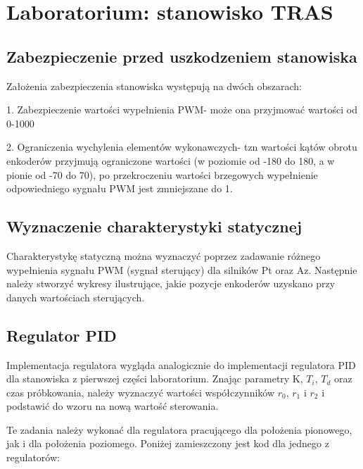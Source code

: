 \chapter{Laboratorium: stanowisko TRAS}

\section{Zabezpieczenie przed uszkodzeniem stanowiska}
Założenia zabezpieczenia stanowiska występują na dwóch obszarach:

1. Zabezpieczenie wartości wypełnienia PWM- może ona przyjmować wartości od 0-1000

2. Ograniczenia wychylenia elementów wykonawczych- tzn wartości kątów obrotu enkoderów przyjmują ograniczone wartości (w poziomie od -180 do 180, a w pionie od -70 do 70), po przekroczeniu wartości brzegowych wypełnienie odpowiedniego sygnału PWM jest zmniejszane do 1.


\section{Wyznaczenie charakterystyki statycznej}
Charakterystykę statyczną można wyznaczyć poprzez zadawanie różnego wypełnienia sygnału PWM (sygnał sterujący) dla silników Pt oraz Az. Następnie należy stworzyć wykresy ilustrujące, jakie pozycje enkoderów uzyskano przy danych wartościach sterujących.
\section{Regulator PID}
Implementacja regulatora wygląda analogicznie do implementacji regulatora PID dla stanowiska z pierwszej części laboratorium. Znając parametry K, $T_i$, $T_d$ oraz czas próbkowania, należy wyznaczyć wartości współczynników $r_0$, $r_1$ i $r_2$ i podstawić do wzoru na nową wartość sterowania.

Te zadania należy wykonać dla regulatora pracującego dla położenia pionowego, jak i dla położenia poziomego. Poniżej zamieszczony jest kod dla jednego z regulatorów:

